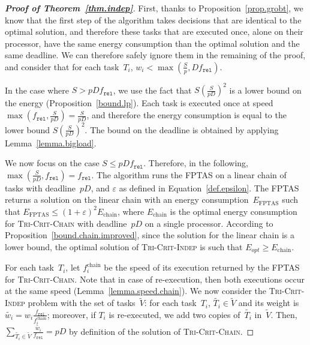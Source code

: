 \documentclass[a4paper]{article}
\theoremstyle{plain}
\theoremstyle{definition}
\theoremstyle{remark}
\newcommand{\fr}{\ensuremath{f_{\texttt{rel}}}\xspace}
\newcommand{\chain}{\textsc{Tri-Crit-Chain}\xspace}
\newcommand{\indep}{\textsc{Tri-Crit-In\-dep}\xspace}
\begin{document}
\begin{proof}[{\bf Proof of Theorem~\ref{thm.indep}}]
First, thanks to Proposition~\ref{prop.grobt}, we know that the first
step of the algorithm takes decisions that are identical to the
optimal solution, and therefore these tasks that are executed once,
alone on their processor, have the same energy consumption than the
optimal solution and the same deadline. We can therefore safely ignore
them in the remaining of the proof, and consider that for each task~$T_i$, 
$w_i<\max(\frac{S}{p},D\fr)$. 

\medskip
In the case where $S>pD\fr$, we use the fact that $S(\frac{S}{pD})^2$ is a lower bound on the
  energy (Proposition~\ref{bound.lp}).  Each task is executed once
  at speed $\max(\fr,\frac{S}{pD})=\frac{S}{pD}$, and therefore the
  energy consumption is equal to the lower bound $S(\frac{S}{pD})^2$. 
  The bound on the deadline is obtained by applying
  Lemma~\ref{lemma.bigload}. 






\medskip
We now focus on the case $S\leq pD\fr$. 
Therefore, in the following, $\max(\frac{S}{pD},\fr)=\fr$.  The
algorithm runs the FPTAS on a linear chain of tasks with
deadline~$pD$, and $\varepsilon$ as defined in
Equation~\eqref{def.epsilon}. The FPTAS returns a solution on the
linear chain with an energy consumption~$E_{\text{FPTAS}}$ such that
$E_{\text{FPTAS}} \leq \left( 1 +
  \varepsilon \right)^2 E_{\text{chain}}$, where $E_{\text{chain}}$ is
the  optimal energy consumption for \chain
with deadline~$pD$ on a single processor. According to
Proposition~\ref{bound.chain.improved}, since the solution for the
linear chain is a lower bound, the optimal solution of \indep is such that 
$E_{opt}\geq E_{\text{chain}}$. 





For each task~$T_i$, let $f_i^{\text{chain}}$ be the speed of its
execution returned by the FPTAS for \chain. Note that in case of
re-execution, then both executions occur at the same speed
(Lemma~\ref{lemma.speed.chain}).  We now consider the \indep problem
with the set of tasks~$\tilde{V}$: for each task~$T_i$,
$\tilde{T_i}\in \tilde{V}$ and its weight is $\tilde{w_i} =
w_i\frac{\fr}{f_i^{\text{chain}}}$; moreover, if $T_i$ is re-executed,
we add two copies of~$\tilde{T_i}$ in~$\tilde{V}$.  Then,
$\sum_{\tilde{T_i}\in \tilde{V}} \frac{\tilde{w_i}}{\fr} = pD$ by
definition of the solution of \chain.



\end{proof}
\end{document}
